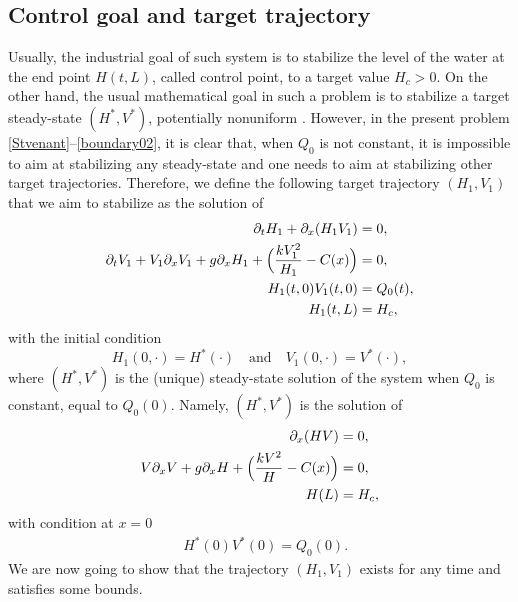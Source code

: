 \subsection{Control goal and target trajectory}
Usually, the industrial goal of such system is to stabilize the level of the water at the end point $H(t,L)$, called control point, to a target value $H_{c}>0$.
On the other hand, the usual mathematical goal in such a problem is to stabilize a target steady-state $(H^{*},V^{*})$, potentially nonuniform \cite[Preface]{BastinCoron1D}. However, in the present problem \eqref{Stvenant}--\eqref{boundary02}, it is clear that, when $Q_{0}$
is not constant, it is impossible to aim at stabilizing any steady-state and one needs to aim at stabilizing other target trajectories.
Therefore, we define the following target trajectory $(H_{1},V_{1})$ that we aim to stabilize as the solution of
\begin{equation}\label{target}
\begin{split}
\partial_{t}H_{1}+\partial_{x}(H_{1}V_{1})&=0,\\
\partial_{t}V_{1}+V_{1}\partial_{x}V_{1}+g\partial_{x}H_{1}+\Bigl(\frac{kV_{1}^{2}}{H_{1}}-C(x)\Bigr)&=0,\\
H_{1}(t,0)V_{1}(t,0)&=Q_{0}(t),\\
H_{1}(t,L)&=H_{c},
\end{split}
\end{equation}
with the initial condition
\begin{equation}\label{initialtarget}
H_{1}(0,\cdot)=H^{*}(\cdot)\quad\text{and}\quad V_{1}(0,\cdot)=V^{*}(\cdot),
\end{equation}
where $(H^{*},V^{*})$ is the (unique) steady-state solution of the system {when $Q_{0}$ is} constant, equal to $Q_{0}(0)$. Namely, $(H^{*},V^{*})$ is the solution of
\begin{equation}
\label{targetsteady0}
\begin{split}
\partial_{x}(HV)&=0,\\
V\partial_{x}V+g\partial_{x}H+\Bigl(\frac{kV^{2}}{H}-C(x)\Bigr)&=0,\\
H(L)&=H_{c},
\end{split}
\end{equation}
with condition at $x=0$
\begin{equation}
\begin{split}
&H^{*}(0)V^{*}(0)=Q_{0}(0).
\end{split}
\label{targetsteady}
\end{equation}
We are now going to show that the trajectory $(H_{1},V_{1})$ exists for any time and satisfies some bounds.

